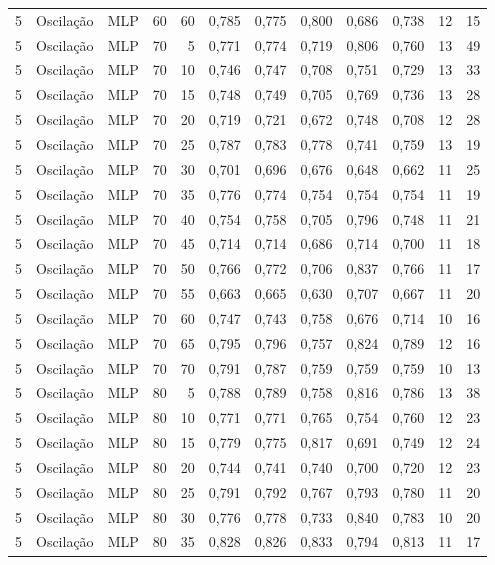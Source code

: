 \begin{longtable}{@{}rllrrrrrrrrr@{}}
5 & Oscilação & MLP & 60 & 60 & 0,785 & 0,775 & 0,800 & 0,686 & 0,738 & 12 & 15 \\
5 & Oscilação & MLP & 70 & 5 & 0,771 & 0,774 & 0,719 & 0,806 & 0,760 & 13 & 49 \\
5 & Oscilação & MLP & 70 & 10 & 0,746 & 0,747 & 0,708 & 0,751 & 0,729 & 13 & 33 \\
5 & Oscilação & MLP & 70 & 15 & 0,748 & 0,749 & 0,705 & 0,769 & 0,736 & 13 & 28 \\
5 & Oscilação & MLP & 70 & 20 & 0,719 & 0,721 & 0,672 & 0,748 & 0,708 & 12 & 28 \\
5 & Oscilação & MLP & 70 & 25 & 0,787 & 0,783 & 0,778 & 0,741 & 0,759 & 13 & 19 \\
5 & Oscilação & MLP & 70 & 30 & 0,701 & 0,696 & 0,676 & 0,648 & 0,662 & 11 & 25 \\
5 & Oscilação & MLP & 70 & 35 & 0,776 & 0,774 & 0,754 & 0,754 & 0,754 & 11 & 19 \\
5 & Oscilação & MLP & 70 & 40 & 0,754 & 0,758 & 0,705 & 0,796 & 0,748 & 11 & 21 \\
5 & Oscilação & MLP & 70 & 45 & 0,714 & 0,714 & 0,686 & 0,714 & 0,700 & 11 & 18 \\
5 & Oscilação & MLP & 70 & 50 & 0,766 & 0,772 & 0,706 & 0,837 & 0,766 & 11 & 17 \\
5 & Oscilação & MLP & 70 & 55 & 0,663 & 0,665 & 0,630 & 0,707 & 0,667 & 11 & 20 \\
5 & Oscilação & MLP & 70 & 60 & 0,747 & 0,743 & 0,758 & 0,676 & 0,714 & 10 & 16 \\
5 & Oscilação & MLP & 70 & 65 & 0,795 & 0,796 & 0,757 & 0,824 & 0,789 & 12 & 16 \\
5 & Oscilação & MLP & 70 & 70 & 0,791 & 0,787 & 0,759 & 0,759 & 0,759 & 10 & 13 \\
5 & Oscilação & MLP & 80 & 5 & 0,788 & 0,789 & 0,758 & 0,816 & 0,786 & 13 & 38 \\
5 & Oscilação & MLP & 80 & 10 & 0,771 & 0,771 & 0,765 & 0,754 & 0,760 & 12 & 23 \\
5 & Oscilação & MLP & 80 & 15 & 0,779 & 0,775 & 0,817 & 0,691 & 0,749 & 12 & 24 \\
5 & Oscilação & MLP & 80 & 20 & 0,744 & 0,741 & 0,740 & 0,700 & 0,720 & 12 & 23 \\
5 & Oscilação & MLP & 80 & 25 & 0,791 & 0,792 & 0,767 & 0,793 & 0,780 & 11 & 20 \\
5 & Oscilação & MLP & 80 & 30 & 0,776 & 0,778 & 0,733 & 0,840 & 0,783 & 10 & 20 \\
5 & Oscilação & MLP & 80 & 35 & 0,828 & 0,826 & 0,833 & 0,794 & 0,813 & 11 & 17 \\

\end{longtable}
